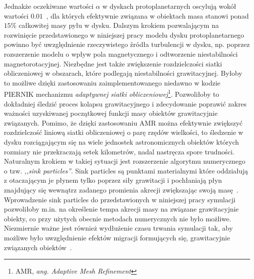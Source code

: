 Jednakże oczekiwane wartości $\alpha$ w dyskach protoplanetarnych oscylują wokół
wartości $0.01$~\cite{FD11}, dla których efektywnie związana w obiektach masa
stanowi ponad $15\%$ całkowitej masy pyłu w dysku. Dalszym krokiem pozwalającym
na rozwinięcie przedstawionego w niniejszej pracy modelu dysku protoplanetarnego
powinno być uwzględnienie rzeczywistego źródła turbulencji w dysku, np. poprzez
rozszerzenie modelu o wpływ pola magnetycznego i odtworzenie niestabilności
magnetorotacyjnej. Niezbędne jest także zwiększenie rozdzielczości siatki
obliczeniowej w obszarach, które podlegają niestabilności grawitacyjnej. Byłoby
to możliwe dzięki zastosowaniu zaimplementowanego niedawno w kodzie \textsc{PIERNIK}
mechanizmu \emph{adaptywnej siatki obliczeniowej}\footnote{AMR, \emph{ang.
Adaptive Mesh Refinement}}. Pozwoliłoby to dokładniej śledzić proces kolapsu
grawitacyjnego i zdecydowanie poprawić zakres ważności uzyskiwanej początkowej
funkcji masy obiektów grawitacyjnie związanych. Pomimo, że dzięki zastosowaniu
AMR można efektywnie zwiększyć rozdzielczość liniową siatki obliczeniowej o parę
rzędów wielkości, to śledzenie w dysku rozciągającym się na wiele jednostek
astronomicznych obiektów których rozmiary nie przekraczają setek kilometrów,
nadal nastręcza spore trudności. Naturalnym krokiem w takiej sytuacji jest
rozszerzenie algorytmu numerycznego o tzw. \emph{,,sink particles''}. Sink
particles są punktami materialnymi które oddziałują z otaczającym je płynem
tylko poprzez siły grawitacji i pochłaniają płyn znajdujący się wewnątrz zadanego
promienia akrecji zwiększając swoją masę~\cite{FBCK10}. Wprowadzenie sink
particles do przedstawionych w niniejszej pracy symulacji pozwoliłoby m.in. na
określenie tempa akrecji masy na związane grawitacyjnie obiekty, co przy użytych
obecnie metodach numerycznych nie było możliwe.
Niezmiernie ważne jest również wydłużenie czasu trwania symulacji tak, aby
możliwe było uwzględnienie efektów migracji formujących się, grawitacyjnie
związanych obiektów~\cite{ML14}.




